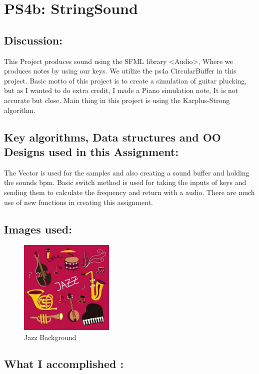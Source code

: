 \section{PS4b: StringSound}\label{sec:ps4b}
\graphicspath{{ps4b}}
\subsection{Discussion:}\label{sec:ps4b:disc}
   This Project produces sound using the SFML library <Audio>, Where we produces notes by using our keys. We utilize the ps4a CircularBuffer in this project.
   Basic motto of this project is to create a simulation of guitar plucking, but as I wanted to do extra credit, I made a Piano simulation note, It is not accurate but close.
   Main thing in this project is using the Karplus-Strong algorithm.

\subsection{Key algorithms, Data structures and OO Designs used in this Assignment:}

The Vector is used for the samples and also creating a sound buffer and holding the sounds bpm. Basic switch method is used for taking the inputs of keys and sending them to calculate the frequency and return with a audio. There are much use of new functions in creating this assignment.

\subsection{Images used:}
\begin{figure}[h]
   \centering
    \includegraphics[width=0.4\textwidth]{ps4b/backg.jpg}
    \caption{Jazz Background}
    \label{fig:bgps4b}
\end{figure}


\subsection{What I accomplished :}

